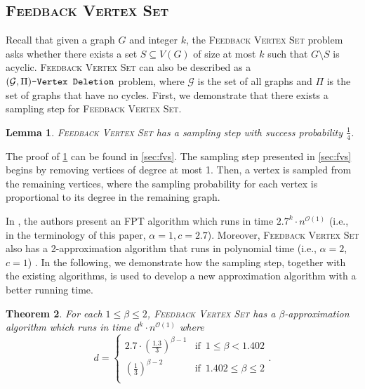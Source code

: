 \documentclass[letterpaper,11pt]{article}
\newcommand{\1}[1]{\mathds{1}\left[#1\right]}
\newcommand{\Oh}{\mathcal{O}}
\newtheorem{theorem}{Theorem}[section]
\newtheorem{lemma}[theorem]{Lemma}
\newcommand{\gpivd}[1][\mathcal{G},\Pi]{(#1)\textnormal{\texttt{-Vertex Deletion}}}
\newcommand{\fvs}{\textsc{Feedback Vertex Set}\xspace}
\begin{document}
\subsection{\fvs}
Recall that given a graph $G$ and integer $k$, the \fvs problem asks whether
there exists a set $S \subseteq V(G)$ of size at most $k$ such that $G \setminus S$ is acyclic.
\fvs can also be described as a $\gpivd$ problem,
where $\mathcal{G}$ is the set of all graphs and $\Pi$ is the set of graphs that have no cycles.
First, we demonstrate that there exists a sampling step for \fvs.
\begin{lemma}\label{lemma:fvs_sampling}
	\fvs has a sampling step with success probability $\frac{1}{4}$.
\end{lemma}

The proof of \cref{lemma:fvs_sampling} can be found in \cref{sec:fvs}.
The sampling step presented in \cref{sec:fvs} begins by removing vertices
of degree at most 1. Then, a vertex is sampled from the remaining vertices,
where the sampling probability for each vertex is proportional to its
degree in the remaining graph.

In \cite{liDetectingFeedbackVertex2022}, the authors present an FPT algorithm which runs in time $2.7^{k} \cdot n^{\Oh(1)}$ (i.e., in the terminology of this paper, $\alpha = 1, c = 2.7$).
Moreover, \fvs also has a 2-approximation algorithm that runs in polynomial time
(i.e., $\alpha = 2$, $c = 1$) \cite{bafna2ApproximationAlgorithmUndirected1999}.
In the following, we demonstrate how the sampling
step, together with the existing algorithms,
is used to develop a new approximation algorithm with a better running time.

\begin{theorem}
	For each $1 \leq \beta \leq 2$, \fvs has a $\beta$-approximation algorithm
	which runs in time $d^{k} \cdot n^{\Oh(1)}$ where
	\begin{equation}\label{eq:fvs_running_time_final}
		d = \begin{cases}
				2.7 \cdot \left( \frac{1.3}{3} \right) ^{\beta - 1} &\text{if }\, 1 \leq \beta < 1.402\\			
				 \left(\frac{1}{3}\right)^{\beta - 2} &\text{if }\, 1.402 \leq \beta \leq 2\\
			\end{cases}.
	\end{equation}
\end{theorem}
\end{document}
